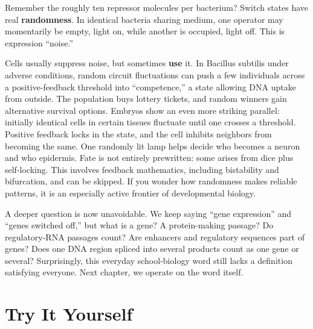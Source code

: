 \begin{tiaozhan}
Remember the roughly ten repressor molecules per bacterium? Switch states have real \textbf{randomness}. In identical bacteria sharing medium, one operator may momentarily be empty, light on, while another is occupied, light off. This is expression ``noise.''

Cells usually suppress noise, but sometimes \textbf{use} it. In Bacillus subtilis under adverse conditions, random circuit fluctuations can push a few individuals across a positive-feedback threshold into ``competence,'' a state allowing DNA uptake from outside. The population buys lottery tickets, and random winners gain alternative survival options. Embryos show an even more striking parallel: initially identical cells in certain tissues fluctuate until one crosses a threshold. Positive feedback locks in the state, and the cell inhibits neighbors from becoming the same. One randomly lit lamp helps decide who becomes a neuron and who epidermis. Fate is not entirely prewritten: some arises from dice plus self-locking. This involves feedback mathematics, including bistability and bifurcation, and can be skipped. If you wonder how randomness makes reliable patterns, it is an especially active frontier of developmental biology.
\end{tiaozhan}

A deeper question is now unavoidable. We keep saying ``gene expression'' and ``genes switched off,'' but what is a gene? A protein-making passage? Do regulatory-RNA passages count? Are enhancers and regulatory sequences part of genes? Does one DNA region spliced into several products count as one gene or several? Surprisingly, this everyday school-biology word still lacks a definition satisfying everyone. Next chapter, we operate on the word itself.

\section*{Try It Yourself}

